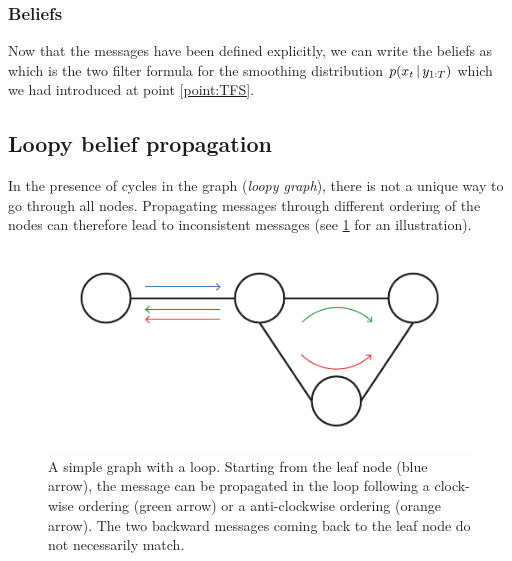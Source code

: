 \subsubsection{Beliefs}
Now that the messages have been defined explicitly, we can write the beliefs as
%
%
which is the two filter formula for the smoothing distribution $p(x_{t}\,|\, y_{1:T})$ which we had introduced at point \ref{point:TFS}.

\subsection{\label{point:LBP}Loopy belief propagation}

In the presence of cycles in the graph (\emph{loopy graph}), there is not a unique way to go through all nodes. 
Propagating messages through different ordering of the nodes can therefore lead to inconsistent messages (see \ref{fig:lbp-inconsistent} for an illustration).
 
\begin{figure}[!h]
\center
\includegraphics[width=.7\textwidth]{figures/lbp/loopy1}
\caption{\label{fig:lbp-inconsistent}A simple graph with a loop. Starting from the leaf node (blue arrow), the message can be propagated in the loop following a clock-wise ordering (green arrow) or a anti-clockwise ordering (orange arrow). The two backward messages coming back to the leaf node do not necessarily match.}
\end{figure}

